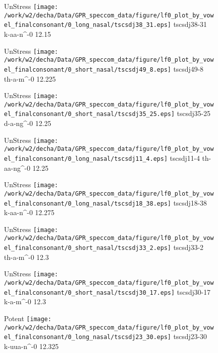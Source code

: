 \documentclass{article}
\begin{document}
\begin{figure}[t]
\begin{minipage}[b]{.24\textwidth}
UnStress
\centering
\texttt{[image: /work/w2/decha/Data/GPR\_speccom\_data/figure/lf0\_plot\_by\_vowel\_finalconsonant/0\_long\_nasal/tscsdj38\_31.eps]}
tscsdj38-31 k-aa-n\textasciicircum-0 12.15
\end{minipage}
\begin{minipage}[b]{.24\textwidth}
UnStress
\centering
\texttt{[image: /work/w2/decha/Data/GPR\_speccom\_data/figure/lf0\_plot\_by\_vowel\_finalconsonant/0\_short\_nasal/tscsdj49\_8.eps]}
tscsdj49-8 th-a-m\textasciicircum-0 12.225
\end{minipage}
\begin{minipage}[b]{.24\textwidth}
UnStress
\centering
\texttt{[image: /work/w2/decha/Data/GPR\_speccom\_data/figure/lf0\_plot\_by\_vowel\_finalconsonant/0\_short\_nasal/tscsdj35\_25.eps]}
tscsdj35-25 d-a-ng\textasciicircum-0 12.25
\end{minipage}
\begin{minipage}[b]{.24\textwidth}
UnStress
\centering
\texttt{[image: /work/w2/decha/Data/GPR\_speccom\_data/figure/lf0\_plot\_by\_vowel\_finalconsonant/0\_long\_nasal/tscsdj11\_4.eps]}
tscsdj11-4 th-aa-ng\textasciicircum-0 12.25
\end{minipage}
\end{figure}
\clearpage
\begin{figure}[t]
\begin{minipage}[b]{.24\textwidth}
UnStress
\centering
\texttt{[image: /work/w2/decha/Data/GPR\_speccom\_data/figure/lf0\_plot\_by\_vowel\_finalconsonant/0\_long\_nasal/tscsdj18\_38.eps]}
tscsdj18-38 k-aa-n\textasciicircum-0 12.275
\end{minipage}
\begin{minipage}[b]{.24\textwidth}
UnStress
\centering
\texttt{[image: /work/w2/decha/Data/GPR\_speccom\_data/figure/lf0\_plot\_by\_vowel\_finalconsonant/0\_short\_nasal/tscsdj33\_2.eps]}
tscsdj33-2 th-a-m\textasciicircum-0 12.3
\end{minipage}
\begin{minipage}[b]{.24\textwidth}
UnStress
\centering
\texttt{[image: /work/w2/decha/Data/GPR\_speccom\_data/figure/lf0\_plot\_by\_vowel\_finalconsonant/0\_short\_nasal/tscsdj30\_17.eps]}
tscsdj30-17 k-a-m\textasciicircum-0 12.3
\end{minipage}
\begin{minipage}[b]{.24\textwidth}
\colorbox{Apricot}{Potent}
\centering
\texttt{[image: /work/w2/decha/Data/GPR\_speccom\_data/figure/lf0\_plot\_by\_vowel\_finalconsonant/0\_long\_nasal/tscsdj23\_30.eps]}
tscsdj23-30 k-uua-n\textasciicircum-0 12.325
\end{minipage}
\end{figure}
\end{document}

